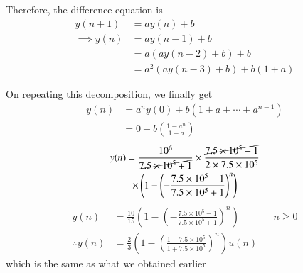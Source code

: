 \documentclass[journal,12pt,twocolumn]{IEEEtran}
\providecommand{\brak}[1]{\ensuremath{\left(#1\right)}}
\numberwithin{equation}{section}
\numberwithin{figure}{section}
\renewcommand\thesection{\arabic{section}}
\begin{document}
\begin{enumerate}[label=\thesection.\arabic*.,ref=\thesection.\theenumi]
	Therefore, the difference equation is
	\begin{align}
		y(n+1) &= ay(n) + b \\
		\implies y(n) &= ay(n-1) + b \\
		&= a(ay(n-2) + b) + b \\
		&= a^2(ay(n-3) + b) + b(1+a) 
	\end{align}
	
	On repeating this decomposition, we finally get
	\begin{align}
		y(n) &= a^ny(0) + b(1+a+\cdots+a^{n-1}) \\
		&= 0 + b\brak{\frac{1-a^n}{1-a}}	
	\end{align}
	\begin{multline}
		y(n) = \frac{10^6}{\cancel{7.5\times10^5 + 1}} \times \frac{\cancel{7.5\times10^5 + 1}}{2 \times 7.5\times10^5} \\ \times \brak{1 - \brak{-\frac{7.5\times10^5 -1}{7.5\times10^5 + 1}}^n }
	\end{multline}
	\begin{align}
		y(n) &= \frac{10}{15}\brak{1 - \brak{-\frac{7.5\times10^5 -1}{7.5\times10^5 + 1}}^n } && n \ge 0\\
		\therefore y(n) &= \frac{2}{3} \brak{1 - \brak{\frac{1-7.5\times10^5}{1+7.5\times10^5}}^n } u(n)
	\end{align}
	which is the same as what we obtained earlier
	
	
	\end{enumerate}
	
\end{document}
